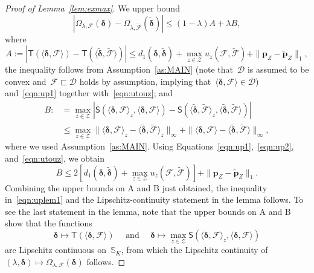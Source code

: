 \documentclass[11pt, a4paper]{article}
\theoremstyle{definition}
\begin{document}
\begin{proof}[Proof of Lemma~\ref{lem:exmax}]
We upper bound~$$|\Omega_{\lambda, \mathcal{F}}(\bm{\delta}) - \Omega_{\lambda, \tilde{\mathcal{F}}}(\tilde{\bm{\delta}})| \leq (1-\lambda) A + \lambda B,$$ where~$$A :=  \left |\mathsf{T}(\langle \bm{\delta}, \mathcal{F} \rangle) - \mathsf{T}(\langle \tilde{\bm{\delta}}, \tilde{\mathcal{F}} \rangle) \right| \leq d_1(\bm{\delta}, \tilde{\bm{\delta}}) + \max_{z \in \mathcal{Z}} u_z({\mathcal{F}}, \tilde{\mathcal{F}}) + \|\bm{p}_Z - \tilde{\bm{p}}_Z\|_1,$$ the inequality follows from Assumption~\ref{as:MAIN} (note that~$\mathscr{D}$ is assumed to be convex and~$\mathcal{F} \sqsubset \mathscr{D}$ holds by assumption, implying that~$\langle \bm{\delta}, \mathcal{F} \rangle \in \mathscr{D}$) and~\eqref{eqn:up1} together with~\eqref{eqn:utouz}; and 
\begin{align*}
B :&=  \max_{z \in \mathcal{Z}} \left| \mathsf{S}\left(\langle \bm{\delta}, \mathcal{F} \rangle_z, \langle \bm{\delta}, \mathcal{F} \rangle\right) - \mathsf{S}\left(\langle \bm{\tilde{\delta}}, \tilde{\mathcal{F}} \rangle_z, \langle \bm{\tilde{\delta}}, \tilde{\mathcal{F}} \rangle \right)\right| \\ &\leq
\max_{z \in \mathcal{Z}} \|\langle \bm{\delta}, \mathcal{F} \rangle_z - \langle \bm{\tilde{\delta}}, \tilde{\mathcal{F}} \rangle_z \|_{\infty} + \|\langle \bm{\delta}, \mathcal{F} \rangle - \langle \bm{\tilde{\delta}}, \tilde{\mathcal{F}} \rangle\|_{\infty},
\end{align*}
%
where we used Assumption~\ref{as:MAIN}. Using Equations~\eqref{eqn:up1},~\eqref{eqn:up2}, and~\eqref{eqn:utouz}, we obtain
%
\begin{equation*}
B \leq 2 \left[ d_1(\bm{\delta}, \tilde{\bm{\delta}}) + \max_{z \in \mathcal{Z}} u_z({\mathcal{F}}, \tilde{\mathcal{F}}) \right] + \|\bm{p}_Z - \tilde{\bm{p}}_Z\|_1.
\end{equation*}
%
Combining the upper bounds on A and B just obtained, the inequality in~\eqref{eqn:uplem1} and the Lipschitz-continuity statement in the lemma follows. To see the last statement in the lemma, note that the upper bounds on A and B show that the functions~$$\bm{\delta} \mapsto \mathsf{T}(\langle \bm{\delta}, \mathcal{F} \rangle) \quad \text{ and } \quad \bm{\delta} \mapsto \max_{z \in \mathcal{Z}} \mathsf{S} \left(\langle \bm{\delta}, \mathcal{F} \rangle_z , \langle \bm{\delta}, \mathcal{F} \rangle \right)$$ are Lipschitz continuous on~$\mathbb{S}_K$, from which the Lipschitz continuity of~$(\lambda, \bm{\delta}) \mapsto \Omega_{\lambda, \mathcal{F}}(\bm{\delta})$ follows.
\end{proof}
\end{document}
